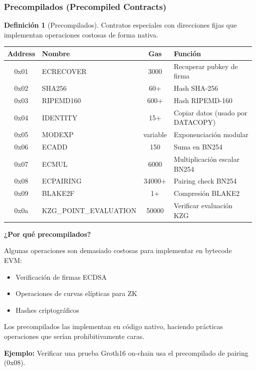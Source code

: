 \documentclass[11pt,a4paper,twoside,openright]{book}
\theoremstyle{definition}
\newtheorem{definition}{Definición}[chapter]
\theoremstyle{plain}
\theoremstyle{remark}
\begin{document}
\subsubsection{Precompilados (Precompiled Contracts)}

\begin{definition}[Precompilados]
Contratos especiales con direcciones fijas que implementan operaciones costosas de forma nativa.
\end{definition}

\begin{center}
\begin{tabular}{clcl}
\toprule
\textbf{Address} & \textbf{Nombre} & \textbf{Gas} & \textbf{Función} \\
\midrule
0x01 & ECRECOVER & 3000 & Recuperar pubkey de firma \\
0x02 & SHA256 & 60+ & Hash SHA-256 \\
0x03 & RIPEMD160 & 600+ & Hash RIPEMD-160 \\
0x04 & IDENTITY & 15+ & Copiar datos (usado por DATACOPY) \\
0x05 & MODEXP & variable & Exponenciación modular \\
0x06 & ECADD & 150 & Suma en BN254 \\
0x07 & ECMUL & 6000 & Multiplicación escalar BN254 \\
0x08 & ECPAIRING & 34000+ & Pairing check BN254 \\
0x09 & BLAKE2F & 1+ & Compresión BLAKE2 \\
0x0a & KZG\_POINT\_EVALUATION & 50000 & Verificar evaluación KZG \\
\bottomrule
\end{tabular}
\end{center}

\begin{keyidea}
\textbf{¿Por qué precompilados?}

Algunas operaciones son demasiado costosas para implementar en bytecode EVM:
\begin{itemize}
    \item Verificación de firmas ECDSA
    \item Operaciones de curvas elípticas para ZK
    \item Hashes criptográficos
\end{itemize}

Los precompilados las implementan en código nativo, haciendo prácticas operaciones que serían prohibitivamente caras.

\textbf{Ejemplo:} Verificar una prueba Groth16 on-chain usa el precompilado de pairing (0x08).
\end{keyidea}
\end{document}
